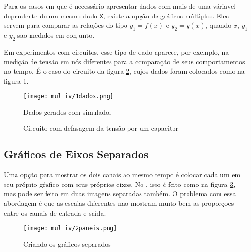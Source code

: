 \edef\indentacao{\the\parindent}

\noindent
\begin{minipage}[t]{0.55\textwidth}\setlength{\parindent}{\indentacao}

    Para os casos em que é necessário apresentar dados com mais de uma váriavel dependente de um mesmo dado \texttt{X}, existe a opção de gráficos múltiplos. Eles servem para comparar as relações do tipo $y_1 = f(x)$ e $y_2 = g(x)$, quando $x$, $y_1$ e $y_2$ são medidos em conjunto.

    Em experimentos com circuitos, esse tipo de dado aparece, por exemplo, na medição de tensão em nós diferentes para a comparação de seus comportamentos no tempo. É o caso do circuito da figura \ref{fig:multiv:circuito}, cujos dados foram colocados como na figura \ref{fig:multiv:dados}.

    \begin{figure}[H]
        \centering
        \texttt{[image: multiv/1dados.png]}

        \caption{Dados gerados com simulador}
        \label{fig:multiv:dados}
    \end{figure}

\end{minipage}\vspace{0.05\textwidth}%
\begin{minipage}[t]{0.4\textwidth}
    \begin{figure}[H]
        \centering
        

        \caption{Circuito com defasagem da tensão por um capacitor}
        \label{fig:multiv:circuito}
    \end{figure}
\end{minipage}


\subsection{Gráficos de Eixos Separados}

    Uma opção para mostrar os dois canais ao mesmo tempo é colocar cada um em seu próprio gŕafico com seus próprios eixos. No \software, isso é feito como na figura \ref{fig:multiv:paneis:tutorial}, mas pode ser feito em duas imagens separadas também. O problema com essa abordagem é que as escalas diferentes não mostram muito bem as proporções entre os canais de entrada e saída.

    \begin{figure}[H]
        \centering
        \texttt{[image: multiv/2paneis.png]}

        \caption{Criando os gráficos separados}
        \label{fig:multiv:paneis:tutorial}
    \end{figure}

